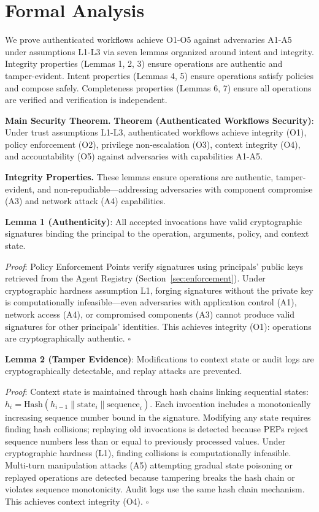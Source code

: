 \section{Formal Analysis}
\label{sec:formal-analysis}

We prove authenticated workflows achieve O1-O5 against adversaries A1-A5 under assumptions L1-L3 via seven lemmas organized around intent and integrity. Integrity properties (Lemmas 1, 2, 3) ensure operations are authentic and tamper-evident. Intent properties (Lemmas 4, 5) ensure operations satisfy policies and compose safely. Completeness properties (Lemmas 6, 7) ensure all operations are verified and verification is independent.

\noindent\textbf{Main Security Theorem.} \textbf{Theorem (Authenticated Workflows Security)}: Under trust assumptions L1-L3, authenticated workflows achieve integrity (O1), policy enforcement (O2), privilege non-escalation (O3), context integrity (O4), and accountability (O5) against adversaries with capabilities A1-A5.

\noindent\textbf{Integrity Properties.} These lemmas ensure operations are authentic, tamper-evident, and non-repudiable—addressing adversaries with component compromise (A3) and network attack (A4) capabilities.

\textbf{Lemma 1 (Authenticity)}: All accepted invocations have valid cryptographic signatures binding the principal to the operation, arguments, policy, and context state.

\textit{Proof}: Policy Enforcement Points verify signatures using principals' public keys retrieved from the Agent Registry (Section~\ref{sec:enforcement}). Under cryptographic hardness assumption L1, forging signatures without the private key is computationally infeasible—even adversaries with application control (A1), network access (A4), or compromised components (A3) cannot produce valid signatures for other principals' identities. This achieves integrity (O1): operations are cryptographically authentic. $\square$

\textbf{Lemma 2 (Tamper Evidence)}: Modifications to context state or audit logs are cryptographically detectable, and replay attacks are prevented.

\textit{Proof}: Context state is maintained through hash chains linking sequential states: $h_i = \text{Hash}(h_{i-1} \parallel \text{state}_i \parallel \text{sequence}_i)$. Each invocation includes a monotonically increasing sequence number bound in the signature. Modifying any state requires finding hash collisions; replaying old invocations is detected because PEPs reject sequence numbers less than or equal to previously processed values. Under cryptographic hardness (L1), finding collisions is computationally infeasible. Multi-turn manipulation attacks (A5) attempting gradual state poisoning or replayed operations are detected because tampering breaks the hash chain or violates sequence monotonicity. Audit logs use the same hash chain mechanism. This achieves context integrity (O4). $\square$

